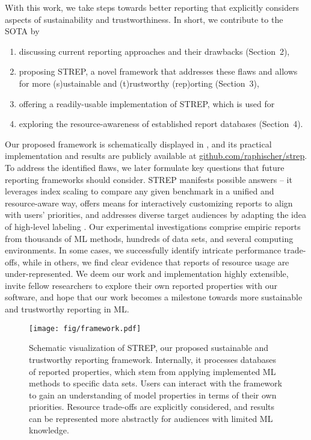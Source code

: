 \documentclass[sn-mathphys,Numbered]{sn-jnl}%
\theoremstyle{thmstylethree}%
\begin{document}
With this work, we take steps towards better reporting that explicitly considers aspects of sustainability and trustworthiness.
In short, we contribute to the SOTA by
\begin{enumerate}
    \item discussing current reporting approaches and their drawbacks (Section~2),
    \item proposing STREP, a novel framework that addresses these flaws and allows for more (s)ustainable and (t)rustworthy (rep)orting (Section~3),
    \item offering a readily-usable implementation of STREP, which is used for
    \item exploring the resource-awareness of established report databases (Section~4).
\end{enumerate}
Our proposed framework is schematically displayed in , and its practical implementation and results are publicly available at \url{github.com/raphischer/strep}.
To address the identified flaws, we later formulate key questions that future reporting frameworks should consider.
STREP manifests possible answers -- it leverages index scaling to compare any given benchmark in a unified and resource-aware way, offers means for interactively customizing reports to align with users' priorities, and addresses diverse target audiences by adapting the idea of high-level labeling \cite{yeswecare}.
Our experimental investigations comprise empiric reports from thousands of ML methods, hundreds of data sets, and several computing environments. 
In some cases, we successfully identify intricate performance trade-offs, while in others, we find clear evidence that reports of resource usage are under-represented.
We deem our work and implementation highly extensible, invite fellow researchers to explore their own reported properties with our software, and hope that our work becomes a milestone towards more sustainable and trustworthy reporting in ML.

\begin{figure*}
    \centering
    \texttt{[image: fig/framework.pdf]}
    \caption{Schematic visualization of STREP, our proposed sustainable and trustworthy reporting framework. Internally, it processes databases of reported properties, which stem from applying implemented ML methods to specific data sets. Users can interact with the framework to gain an understanding of model properties in terms of their own priorities. Resource trade-offs are explicitly considered, and results can be represented more abstractly for audiences with limited ML knowledge.}
    \label{fig:framework}
\end{figure*}
\end{document}
